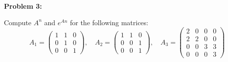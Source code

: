 \documentclass[12pt]{article}
\newenvironment{problem}[1]{
    \textbf{Problem #1:}
}{
    \rmfamily \vspace{1em}
}
\begin{document}
\begin{problem}{3}
    Compute \(A^n\) and \(e^{An}\) for the following matrices:
    \[
        A_1 = \begin{pmatrix}
            1 & 1 & 0 \\
            0 & 1 & 0 \\
            0 & 0 & 1
        \end{pmatrix}, \quad A_2 = \begin{pmatrix}
            1 & 1 & 0 \\
            0 & 0 & 1 \\
            0 & 0 & 1
        \end{pmatrix}, \quad A_3 = \begin{pmatrix}
            2 & 0 & 0 & 0 \\
            2 & 2 & 0 & 0 \\
            0 & 0 & 3 & 3 \\
            0 & 0 & 0 & 3
        \end{pmatrix}
    \]
\end{problem}
\end{document}
